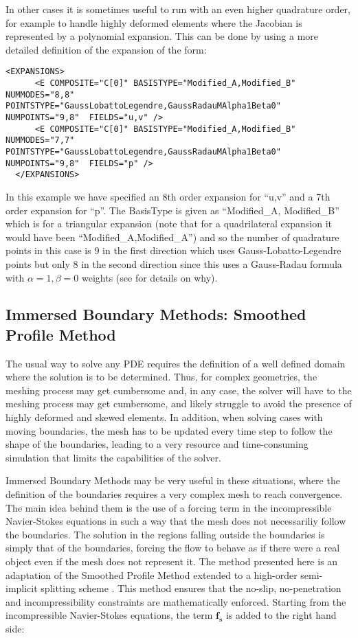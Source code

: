 In other cases it is sometimes useful to run with an even higher
quadrature order, for example to handle highly deformed elements where
the Jacobian is represented by a polynomial expansion. This can be done
by using a more detailed definition of the expansion of the form:


\begin{lstlisting}[style=XMLStyle]
  <EXPANSIONS>
      <E COMPOSITE="C[0]" BASISTYPE="Modified_A,Modified_B" NUMMODES="8,8" POINTSTYPE="GaussLobattoLegendre,GaussRadauMAlpha1Beta0" NUMPOINTS="9,8"  FIELDS="u,v" />
      <E COMPOSITE="C[0]" BASISTYPE="Modified_A,Modified_B" NUMMODES="7,7" POINTSTYPE="GaussLobattoLegendre,GaussRadauMAlpha1Beta0" NUMPOINTS="9,8"  FIELDS="p" />
  </EXPANSIONS>
\end{lstlisting}

In this example we have specified an 8th order expansion for ``u,v''
and a 7th order expansion for ``p''. The BasisType is given as
``Modified\_A, Modified\_B'' which is for a triangular expansion (note that for
a quadrilateral expansion it would have been ``Modified\_A,Modified\_A'')
and so the number of quadrature points in this case is 9 in the first
direction which uses Gauss-Lobatto-Legendre points but only 8 in the
second direction since this uses a Gauss-Radau formula with
$\alpha=1,\beta=0$ weights (see \cite{KaSh05} for details on why).

\subsection{Immersed Boundary Methods: Smoothed Profile Method}

The usual way to solve any PDE requires the definition of a well defined domain
where the solution is to be determined. Thus, for complex geometries, the
meshing process may get cumbersome and, in any case, the solver will have to
the meshing process may get cumbersome, and likely struggle to avoid the
presence of highly deformed and skewed elements. In addition, when solving
cases with moving boundaries, the mesh has to be updated every time step to
follow the shape of the boundaries, leading to a very resource and
time-consuming simulation that limits the capabilities of the solver.

Immersed Boundary Methods may be very useful in these situations, where the
definition of the boundaries requires a very complex mesh to reach
convergence. The main idea behind them is the use of a forcing term in the
incompressible Navier-Stokes equations in such a way that the mesh does not
necessariliy follow the boundaries. The solution in the regions falling outside
the boundaries is simply that of the boundaries, forcing the flow to behave as
if there were a real object even if the mesh does not represent it. The method
presented here is an adaptation of the Smoothed Profile Method
\cite{NakayamaSPM} extended to a high-order semi-implicit splitting scheme
\cite{LuoSPM, WangSPM}. This method ensures that the no-slip, no-penetration
and incompressibility constraints are mathematically enforced. Starting from
the incompressible Navier-Stokes equations, the term $\mathbf{f_s}$ is added to
the right hand side:

